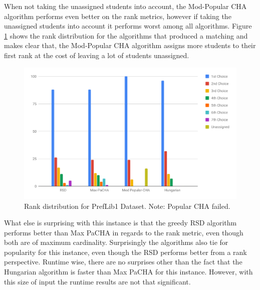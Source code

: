 When not taking the unassigned students into account, the Mod-Popular CHA algorithm performs even better on the rank metrics, however if taking the unassigned students into account it performs worst among all algorithms. Figure \ref{fig:preflib1-rank-distribution} shows the rank distribution for the algorithms that produced a matching and makes clear that, the Mod-Popular CHA algorithm assigns more students to their first rank at the cost of leaving a lot of students unassigned. 

\begin{figure}[h!]
  \centering
    \includegraphics[width=0.9\linewidth]{assets/plots/preflib1-ranks.pdf}    
    \caption{Rank distribution for PrefLib1 Dataset. Note: Popular CHA failed.}
    \label{fig:preflib1-rank-distribution}
\end{figure}

What else is surprising with this instance is that the greedy RSD algorithm performs better than Max PaCHA in regards to the rank metric, even though both are of maximum cardinality. Surprisingly the algorithms also tie for popularity for this instance, even though the RSD performs better from a rank perspective. Runtime wise, there are no surprises other than the fact that the Hungarian algorithm is faster than Max PaCHA for this instance. However, with this size of input the runtime results are not that significant.

